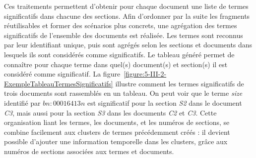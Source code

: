 Ces traitements permettent d'obtenir pour chaque document une liste de termes significatifs dans chacune des sections.
Afin d'ordonner par la suite les fragments réutilisables et former des scénarios plus concrets, une agrégation des termes significatifs de l'ensemble des documents est réalisée.
Les termes sont reconnus par leur identifiant unique, puis sont agrégés selon les sections et documents dans lesquels ils sont considérés comme significatifs.
Le tableau généré permet de connaître pour chaque terme dans quel(s) document(s) et section(s) il est considéré comme significatif.
La figure~\ref{figure:5-III-2-ExempleTableauTermesSignificatifs} illustre comment les termes significatifs de trois documents sont rassemblés en un tableau.
On peut voir que le terme \og \textit{size} \fg identifié par \og \textit{$bn{:}00016413n$} \fg est significatif pour la section \textit{S2} dans le document \textit{C3}, mais aussi pour la section \textit{S3} dans les documents \textit{C2} et \textit{C3}.
Cette organisation liant les termes, les documents, et les numéros de sections, se combine facilement aux clusters de termes précédemment créés : il devient possible d'ajouter une information temporelle dans les clusters, grâce aux numéros de sections associées aux termes et documents.


\newpage

\hspace{0pt}
\vfill

